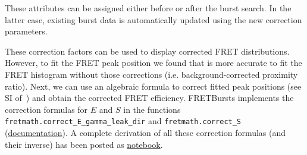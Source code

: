These attributes can be assigned either before or after the burst search. In the
latter case, existing burst data is automatically updated using the new
correction parameters.

These correction factors can be used to display corrected FRET distributions.
However, to fit the FRET peak position we found that is more accurate to 
fit the FRET histogram without those corrections (i.e. background-corrected
proximity ratio). Next, we can use an algebraic formula to correct fitted peak
positions (see SI of~\cite{Lee_2005}) and obtain the corrected FRET efficiency.
FRETBursts implements the correction formulas for $E$ and $S$ in the functions
\verb|fretmath.correct_E_gamma_leak_dir| and \verb|fretmath.correct_S|
(\href{http://fretbursts.readthedocs.org/en/latest/fretmath.html}{documentation}). 
A complete derivation of all these correction formulas
(and their inverse) has been posted as \href{http://nbviewer.jupyter.org/github/tritemio/notebooks/blob/master/Derivation%20of%20FRET%20and%20S%20correction%20formulas.ipynb}{notebook}.
